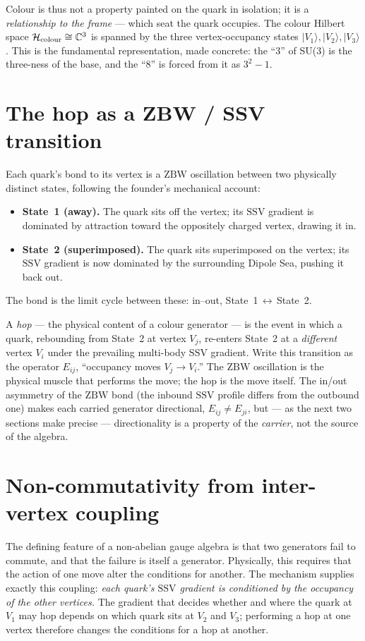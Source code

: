 \documentclass[11pt,a4paper]{article}
\newcommand{\SSV}{\mathrm{SSV}}
\newcommand{\ZBW}{\mathrm{ZBW}}
\newcommand{\ket}[1]{|#1\rangle}
\begin{document}
Colour is thus not a property painted on the quark in isolation; it is a
\emph{relationship to the frame} --- which seat the quark occupies. The colour
Hilbert space $\mathcal{H}_{\rm colour}\cong\mathbb{C}^3$ is spanned by the
three vertex-occupancy states $\ket{V_1},\ket{V_2},\ket{V_3}$. This is the
fundamental representation, made concrete: the ``3'' of SU(3) is the three-ness
of the base, and the ``8'' is forced from it as $3^2-1$.

\section{The hop as a ZBW / SSV transition}
\label{sec:hop}

Each quark's bond to its vertex is a $\ZBW$ oscillation between two physically
distinct states, following the founder's mechanical account:
\begin{itemize}
\item \textbf{State~1 (away).} The quark sits off the vertex; its $\SSV$ gradient
is dominated by attraction toward the oppositely charged vertex, drawing it in.
\item \textbf{State~2 (superimposed).} The quark sits superimposed on the
vertex; its $\SSV$ gradient is now dominated by the surrounding Dipole Sea,
pushing it back out.
\end{itemize}
The bond is the limit cycle between these: in--out, State~1$\,\leftrightarrow\,$State~2.

A \emph{hop} --- the physical content of a colour generator --- is the event in
which a quark, rebounding from State~2 at vertex $V_j$, re-enters State~2 at a
\emph{different} vertex $V_i$ under the prevailing multi-body $\SSV$ gradient.
Write this transition as the operator $E_{ij}$, ``occupancy moves $V_j\!\to\!
V_i$.'' The $\ZBW$ oscillation is the physical muscle that performs the move; the
hop is the move itself. The in/out asymmetry of the $\ZBW$ bond (the inbound
$\SSV$ profile differs from the outbound one) makes each carried generator
directional, $E_{ij}\neq E_{ji}$, but --- as the next two sections make precise
--- directionality is a property of the \emph{carrier}, not the source of the
algebra.

\section{Non-commutativity from inter-vertex coupling}
\label{sec:coupling}

The defining feature of a non-abelian gauge algebra is that two generators fail
to commute, and that the failure is itself a generator. Physically, this
requires that the action of one move alter the conditions for another. The
mechanism supplies exactly this coupling: \emph{each quark's $\SSV$ gradient is
conditioned by the occupancy of the other vertices.} The gradient that decides
whether and where the quark at $V_1$ may hop depends on which quark sits at
$V_2$ and $V_3$; performing a hop at one vertex therefore changes the conditions
for a hop at another.
\end{document}
